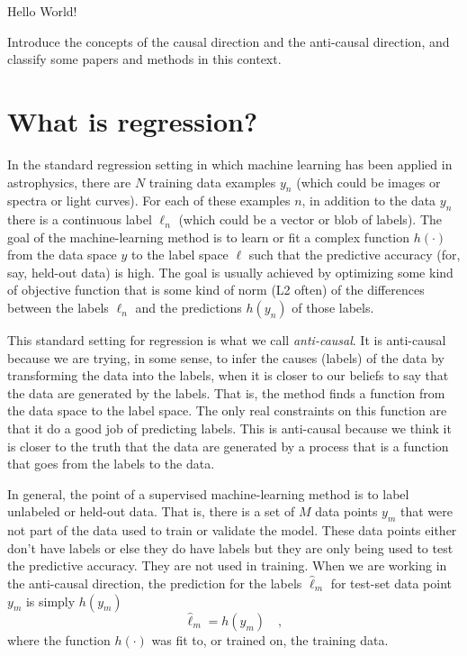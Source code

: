 \documentclass[12pt, letterpaper]{article}
\begin{document}
Hello World!

Introduce the concepts of the causal direction and the anti-causal
direction, and classify some papers and methods in this context.

\section{What is regression?}

In the standard regression setting in which machine learning has been
applied in astrophysics, there are $N$ training data examples $y_n$
(which could be images or spectra or light curves).
For each of these examples $n$, in addition to the data $y_n$ there is
a continuous label $\ell_n$ (which could be a vector or blob of
labels).
The goal of the machine-learning method is to learn or fit a complex
function $h(\cdot)$ from the data space $y$ to the label space $\ell$
such that the predictive accuracy (for, say, held-out data) is high.
The goal is usually achieved by optimizing some kind of objective
function that is some kind of norm (L2 often) of the differences
between the labels $\ell_n$ and the predictions $h(y_n)$ of those
labels.

This standard setting for regression is what we call
\emph{anti-causal}.
It is anti-causal because we are trying, in some sense, to infer the
causes (labels) of the data by transforming the data into the labels,
when it is closer to our beliefs to say that the data are generated by
the labels.
That is, the method finds a function from the data space to the label
space.
The only real constraints on this function are that it do a good job
of predicting labels.
This is anti-causal because we think it is closer to the truth
that the data are generated by a process that is a function that goes 
from the labels to the data.

In general, the point of a supervised machine-learning method is to
label unlabeled or held-out data.
That is, there is a set of $M$ data points $y_m$ that were not part of
the data used to train or validate the model.
These data points either don't have labels or else they do have labels
but they are only being used to test the predictive accuracy.
They are not used in training.
When we are working in the anti-causal direction, the prediction for
the labels $\hat{\ell}_m$ for test-set data point $y_m$ is simply
$h(y_m)$
\begin{equation}
\hat{\ell}_m = h(y_m)
\quad ,
\end{equation}
where the function $h(\cdot)$ was fit to, or trained on, the
training data.
\end{document}
